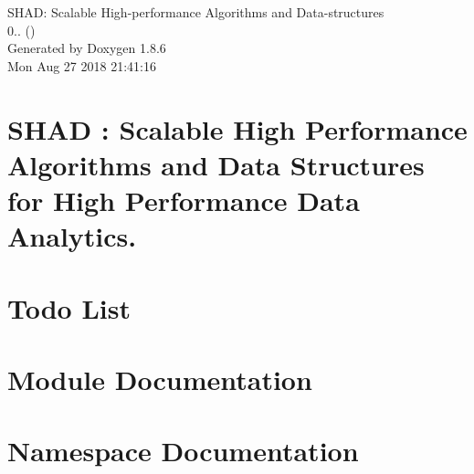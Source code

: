 \documentclass[twoside]{book}
\newcommand{\clearemptydoublepage}{%
  \newpage{\pagestyle{empty}\cleardoublepage}%
}
\begin{document}
\hypersetup{pageanchor=false}
\begin{titlepage}
\vspace*{7cm}
\begin{center}%
{\Large S\-H\-A\-D\-: Scalable High-\/performance Algorithms and Data-\/structures \\[1ex]\large 0.. () }\\
\vspace*{1cm}
{\large Generated by Doxygen 1.8.6}\\
\vspace*{0.5cm}
{\small Mon Aug 27 2018 21:41:16}\\
\end{center}
\end{titlepage}
\clearemptydoublepage
\tableofcontents
\clearemptydoublepage
{}
\hypersetup{pageanchor=true}

\chapter{S\-H\-A\-D \-: Scalable High Performance Algorithms and Data Structures for High Performance Data Analytics.}
\label{index}\hypertarget{index}{}
\chapter{Todo List}
\label{todo}
\hypertarget{todo}{}

\chapter{Module Documentation}










\chapter{Namespace Documentation}


\end{document}
